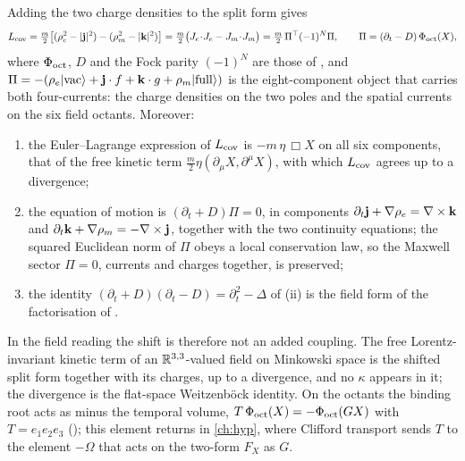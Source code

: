 \begin{theorem}
\label{thm:completed}
Adding the two charge densities to the split form gives
\begin{equation}
\label{eq:Lcov}
L_{\rm cov}=\tfrac m2\bigl[(\rho_e^2-|\mathbf j|^2)-(\rho_m^2-|\mathbf k|^2)\bigr]=\tfrac m2\bigl(J_e\!\cdot\!J_e-J_m\!\cdot\!J_m\bigr)
=\tfrac m2\,\Pi^{\top}(-1)^N\Pi,\qquad \Pi=(\partial_t-D)\,\Phi_{\rm oct}(X),
\end{equation}
where $\Phi_{\rm oct}$, $D$ and the Fock parity $(-1)^N$ are those of , and
$\Pi=-(\rho_e|\mathrm{vac}\rangle+\mathbf j\cdot f+\mathbf k\cdot g+\rho_m|\mathrm{full}\rangle)$ is the eight-component object that carries both
four-currents: the charge densities on the two poles and the spatial currents on the six field octants. Moreover:
\begin{enumerate}[label=(\roman*),leftmargin=2.2em,itemsep=1pt]
\item the Euler--Lagrange expression of $L_{\rm cov}$ is $-m\,\eta\,\Box X$ on all six components, that of the free kinetic term
$\tfrac m2\eta(\partial_\mu X,\partial^\mu X)$, with which $L_{\rm cov}$ agrees up to a divergence;
\item the equation of motion is $(\partial_t+D)\Pi=0$, in components $\partial_t\mathbf j+\nabla\rho_e=\nabla\times\mathbf k$ and
$\partial_t\mathbf k+\nabla\rho_m=-\nabla\times\mathbf j$, together with the two continuity equations; the squared Euclidean norm of $\Pi$ obeys a local
conservation law, so the Maxwell sector $\Pi=0$, currents and charges together, is preserved;
\item the identity $(\partial_t+D)(\partial_t-D)=\partial_t^2-\Delta$ of (ii) is the field form of the factorisation of
.
\end{enumerate}
\end{theorem}

In the field reading the shift is therefore not an added coupling. The free Lorentz-invariant kinetic term of an $\mathbb{R}^{3,3}$-valued field
on Minkowski space is the shifted split form together with its charges, up to a divergence, and no $\kappa$ appears in it; the divergence
is the flat-space Weitzenb\"ock identity. On the octants the binding root acts as minus the temporal volume,
$T\,\Phi_{\rm oct}(X)=-\Phi_{\rm oct}(GX)$ with $T=e_1e_2e_3$ (); this element returns in \cref{ch:hyp}, where Clifford
transport sends $T$ to the element $-\Omega$ that acts on the two-form $F_X$ as $G$.

